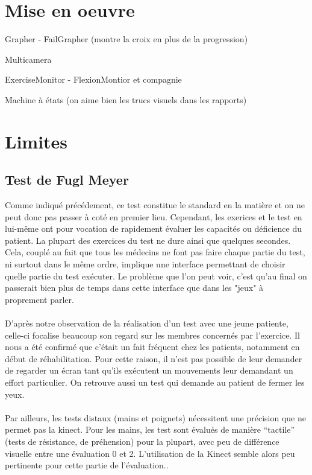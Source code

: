 \documentclass[french,12pt]{report}
\begin{document}
		\section{Mise en oeuvre} 	%

		Grapher
		- FailGrapher (montre la croix en plus de la progression)
		
		Multicamera
		
		ExerciseMonitor
		- FlexionMontior et compagnie
		
		Machine à états (on aime bien les trucs visuels dans les rapports)
		
		\section{Limites}%
			\subsection{Test de Fugl Meyer}
Comme indiqué précédement, ce test constitue le standard en la matière et on ne peut donc pas passer à coté en premier lieu.
Cependant, les exerices et le test en lui-même ont pour vocation de rapidement évaluer les capacités ou déficience
du patient. La plupart des exercices du test ne dure ainsi que quelques secondes. Cela, couplé au fait que tous les 
médecins ne font pas faire chaque partie du test, ni surtout dans le même ordre, implique une interface permettant de 
choisir quelle partie du test exécuter. Le problème que l’on peut voir, c'est qu'au final on passerait 
bien plus de temps dans cette interface que dans les "jeux" à proprement parler.

\paragraph{}
D'après notre observation de la réalisation d'un test avec une jeune patiente, celle-ci focalise 
beaucoup son regard sur les membres concernés par l'exercice. Il nous a été confirmé que c'était un fait fréquent
chez les patients, notamment en début de réhabilitation. Pour cette raison, il n'est pas possible de leur
demander de regarder un écran tant qu'ils exécutent un mouvements leur demandant un effort particulier.
On retrouve aussi un test qui demande au patient de fermer les yeux.

\paragraph{}
Par ailleurs, les tests distaux (mains et poignets) nécessitent une précision que ne permet pas la kinect.
Pour les mains, les test sont évalués de manière “tactile” (tests de résistance, de préhension) pour la plupart, 
avec peu de différence visuelle entre une évaluation 0 et 2. L’utilisation de la Kinect semble alors 
peu pertinente pour cette partie de l’évaluation..
\end{document}
